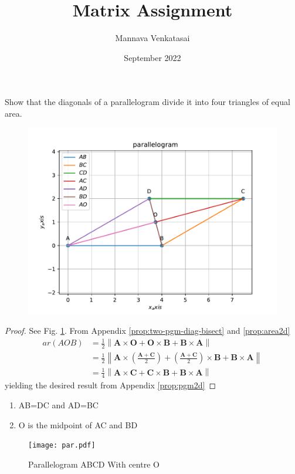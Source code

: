 \documentclass[journal,10pt,twocolumn]{article}
\title{\textbf{Matrix Assignment}}
\author{Mannava Venkatasai}
\date{September 2022}
\providecommand{\norm}[1]{\left\lVert#1\right\rVert}
\let\vec\mathbf
\providecommand{\brak}[1]{\ensuremath{\left(#1\right)}}
\begin{document}
\maketitle
\fi
 Show that the diagonals of a parallelogram divide
it into four triangles of equal area.
	\begin{figure}[!h]
		\centering
 \includegraphics[width=\columnwidth]{chapters/9/9/3/3/figs/par.pdf}
		\caption{}
		\label{fig:9/9/3/3}
  	\end{figure}
\begin{proof}
	See Fig. 
		\ref{fig:9/9/3/3}.
	From Appendix
	  \ref{prop:two-pgm-diag-bisect} and 
  \ref{prop:area2d}
\begin{align}
	ar\brak{AOB} &= 
	\frac{1}{2} \norm{\vec{A} \times \vec{O}+\vec{O} \times \vec{B}+\vec{B} \times \vec{A}}
	\\
	&=	\frac{1}{2} \norm{\vec{A} \times \brak{\frac{\vec{A}+\vec{C}}{2}}+\brak{\frac{\vec{A}+\vec{C}}{2}} \times \vec{B}+\vec{B} \times \vec{A}}
	\\
	&=\frac{1}{4} \norm{\vec{A} \times \vec{C}+\vec{C} \times \vec{B}+\vec{B} \times \vec{A}}
  \end{align}
  yielding the desired result from Appendix
  \ref{prop:pgm2d}
\end{proof}
\iffalse
\begin{enumerate}
	\item AB=DC and AD=BC
	\item O is the midpoint of AC and BD
\end{enumerate}
\begin{figure}[h]
\centering
\texttt{[image: par.pdf]}
\caption{Parallelogram ABCD With centre O}
\label{fig:Parallelogram}
\end{figure}
\end{document}
